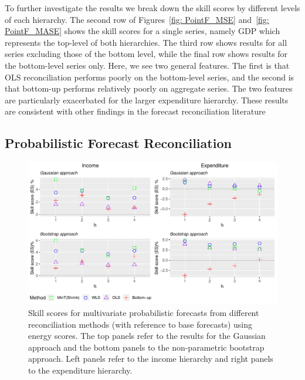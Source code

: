 \documentclass[a4paper, 11pt]{article}
\begin{document}
To further investigate the results we break down the skill scores by different levels of each hierarchy. The second row of Figures~\ref{fig: PointF_MSE} and~\ref{fig: PointF_MASE} shows the skill scores for a single series, namely GDP which represents the top-level of both hierarchies. The third row shows results for all series excluding those of the bottom level, while the final row shows results for the bottom-level series only. Here, we see two general features. The first is that OLS reconciliation performs poorly on the bottom-level series, and the second is that bottom-up performs relatively poorly on aggregate series. The two features are particularly exacerbated for the larger expenditure hierarchy. These results are consistent with other findings in the forecast reconciliation literature \citep[see for instance][]{AthEtAl2017,WicEtAl2019}

\subsection{Probabilistic Forecast Reconciliation}

\begin{figure}[!b]
	\centering
	\small
	\includegraphics[width=\textwidth]{Figs/Results/ProbF_MultivS.pdf}
	\caption{Skill scores for multivariate probabilistic forecasts from different reconciliation methods (with reference to base forecasts) using energy scores. The top panels refer to the results for the Gaussian approach and the bottom panels to the non-parametric bootstrap approach. Left panels refer to the income hierarchy and right panels to the expenditure hierarchy.}
	\label{fig: Prob-forecasts-SS_ES}
\end{figure}
\end{document}
